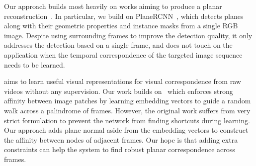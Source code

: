 Our approach builds most heavily on works aiming to produce a planar reconstruction~\cite{liu2018planenet,yang2018recovering,liu2019planercnn,YuZLZG19,chen2020oasis,jiang2020peek}. In particular, we build on PlaneRCNN~\cite{liu2019planercnn}, which detects planes along with their geometric properties and instance masks from a single RGB image. Despite using surrounding frames to improve the detection quality, it only addresses the detection based on a single frame, and does not touch on the application when the temporal correspondence of the targeted image sequence needs to be learned. 




\cite{CVPR2019_CycleTime, jabri2020walk} aims to learn useful visual representations for visual correspondence from raw videos without any supervision.
Our work builds on~\cite{jabri2020walk} which enforces strong affinity between image patches by learning embedding vectors to guide a random walk across a palindrome of frames. However, the original work suffers from very strict formulation to prevent the network from finding shortcuts during learning. Our approach adds plane normal aside from the embedding vectors to construct the affinity between nodes of adjacent frames. Our hope is that adding extra constraints can help the system to find robust planar correspondence across frames.

